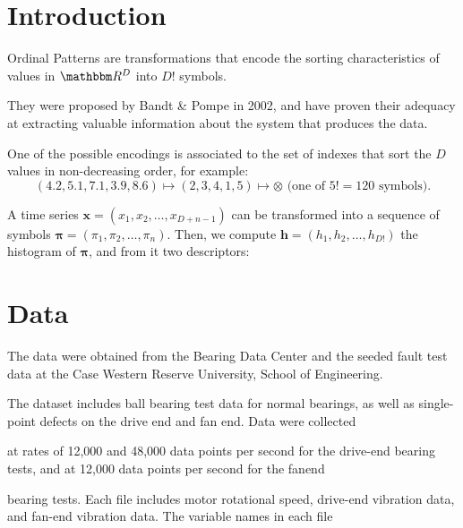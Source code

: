 \documentclass[a0,portrait]{a0poster}
\begin{document}
\begin{mdframed}[style=MyFrame]

\begin{multicols}{2} %



\section{Introduction}

Ordinal Patterns are transformations that encode the sorting characteristics of values in $\mathbbm R^D$ into $D!$ symbols.

They were proposed by Bandt \& Pompe in 2002, and have proven their adequacy at extracting valuable information about the system that produces the data.

One of the possible encodings is associated to the set of indexes that sort the $D$ values in non-decreasing order, for example:
$$
(4.2, 5.1, 7.1, 3.9, 8.6) \longmapsto (2, 3, 4, 1, 5) \longmapsto \otimes \text{ (one of }5!=120 \text{ symbols)}.
$$

A time series $\bm x = (x_1,x_2,\dots,x_{D+n-1})$ can be transformed into a sequence of symbols $\bm \pi=(\pi_1,\pi_2,\dots,\pi_n)$.
Then, we compute $\bm h =(h_1,h_2,\dots,h_{D!})$ the histogram of $\bm \pi$, and from it two descriptors:

\section{Data}\label{section:1}
The data were obtained from the Bearing Data Center and the seeded fault test data at the Case Western Reserve University, School of Engineering. 

The dataset includes ball bearing test data for normal bearings, as well as single-point defects on the drive end and fan end. Data were collected 

at rates of 12,000 and 48,000 data points per second for the drive-end bearing tests, and at 12,000 data points per second for the fanend

bearing tests. Each file includes motor rotational speed, drive-end vibration data, and fan-end vibration data. The variable names in each file


\end{multicols}
\end{mdframed}
\end{document}
